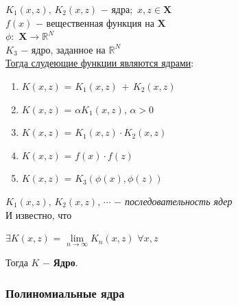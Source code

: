         \begin{theorem}
            $K_1(x, z), \, K_2(x, z)$ $-$ ядра; $\, x, z \in \mathbf{X}$\\

            $f(x)$ $-$ вещественная функция на $\mathbf{X}$\\

            $\phi:$ $\mathbf{X} \to \mathbb{R}^N$\\

            $K_3$ $-$ ядро, заданное на $\mathbb{R}^N$\\

            \underline{Тогда слудеющие функции являются ядрами}:
            \begin{enumerate}
                \item $K(x, z)$ = $K_1(x, z) \, + \, K_2(x, z)$

                \item $K(x, z)$ = $\alpha K_1(x, z)$, \quad $\alpha > 0$

                \item $K(x, z)$ = $K_1(x, z) \cdot K_2(x, z)$

                \item $K(x, z)$ = $f(x) \cdot f(z)$

                \item $K(x, z)$ = $K_3(\phi(x), \phi(z))$
            \end{enumerate}
            \hline
        \end{theorem}



        \begin{theorem}
            $K_1(x, z), \, K_2(x, z), \, \cdots$ $-$ \textit{последовательность ядер}\\

            И известно, что
            \begin{center}
                $\exists K(x, z)$ = $\lim\limits_{n \to \infty}{K_n(x, z)}$ \quad $\forall x, z$ 
            \end{center}

             Тогда $K$ $-$ \textbf{Ядро}.

             \hline
        \end{theorem}
        


    \subsubsection{Полиномиальные ядра}

